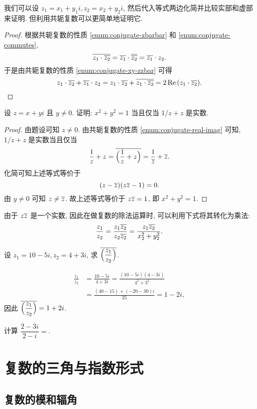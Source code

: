 我们可以设 $z_1=x_1+y_1i,z_2=x_2+y_2i$, 然后代入等式两边化简并比较实部和虚部来证明.
但利用共轭复数可以更简单地证明它.

\begin{proof}
  根据共轭复数的性质  \ref{enum:conjugate-zbarbar} 和  \ref{enum:conjugate-commutes},
  \[\overline{z_1\cdot\overline{z_2}}=\overline{z_1}\cdot\overline{\overline{z_2}}=\overline{z_1}\cdot z_2.\]
  于是由共轭复数的性质  \ref{enum:conjugate-xy-zzbar} 可得
    \[z_1\cdot\overline{z_2}+\overline{z_1}\cdot z_2
      =z_1\cdot\overline{z_2}+\overline{z_1\cdot\overline{z_2}}
      =2\operatorname{Re}{(z_1\cdot\overline{z_2})}.\]
\end{proof}

\begin{example}
  设 $z=x+yi$ 且 $y\neq 0$. 证明: $x^2+y^2=1$ 当且仅当 $1/z+z$ 是实数.
\end{example}
\begin{proof}
  由题设可知 $z\neq 0$.
  由共轭复数的性质  \ref{enum:conjugate-real-imag} 可知, 
  $1/z+z$ 是实数当且仅当
  \[
    \frac1z+z=\overline{\Bigl(\frac1z+z\Bigr)}
    =\frac1{\overline z}+\overline z.
  \]
  化简可知上述等式等价于
  \[
    (z-\overline z)(z\overline z-1)=0.
  \]
  由 $y\neq0$ 可知 $z\neq \overline z$.
  故上述等式等价于 $z\overline z=1$, 即 $x^2+y^2=1$.
\end{proof}

由于 $z\overline z$ 是一个实数,
因此在做复数的除法运算时, 可以利用下式将其转化为乘法:
  \[\dfrac{z_1}{z_2}=\dfrac{z_1\overline{z_2}}{z_2\overline{z_2}}=\dfrac{z_1\overline{z_2}}{x_2^2+y_2^2}.\]
\begin{example}
  设 $z_1=10-5i,z_2=4+3i$, 求 $\overline{\Bigl(\dfrac{z_1}{z_2}\Bigr)}$.
\end{example}
\begin{solution}
  \begin{align*}
    \frac{z_1}{z_2}&=\frac{10-5i}{4+3i}
    =\frac{(10-5i)(4-3i)}{4^2+3^2}\\
    &=\frac{(40-15)+(-20-30)i}{25}=1-2i,
  \end{align*}
  因此 $\overline{\Bigl(\dfrac{z_1}{z_2}\Bigr)}=1+2i$.
\end{solution}

\begin{exercise}
  计算 $\dfrac{2-3i}{2-i}=$\fillblank[6em]{}.
\end{exercise}

\section{复数的三角与指数形式}

\subsection{复数的模和辐角}

